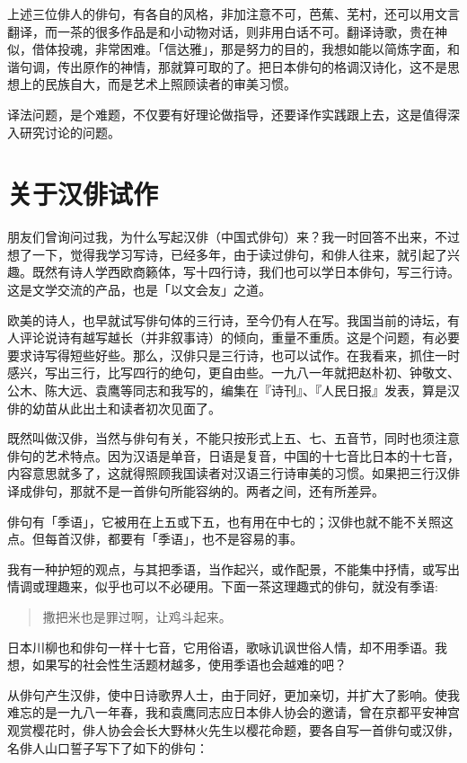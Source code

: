 {    上述三位俳人的俳句，有各自的风格，非加注意不可，芭蕉、芜村，还可以用文言翻译，而一茶的很多作品是和小动物对话，则非用白话不可。翻译诗歌，贵在神似，借体投魂，非常困难。「信达雅」，那是努力的目的，我想如能以简炼字面，和谐句调，传出原作的神情，那就算可取的了。把日本俳句的格调汉诗化，这不是思想上的民族自大，而是艺术上照顾读者的审美习惯。

    译法问题，是个难题，不仅要有好理论做指导，还要译作实践跟上去，这是值得深入研究讨论的问题。

    \section*{\FS 关于汉俳试作}

    朋友们曾询问过我，为什么写起汉俳（中国式俳句）来？我一时回答不出来，不过想了一下，觉得我学习写诗，已经多年，由于读过俳句，和俳人往来，就引起了兴趣。既然有诗人学西欧商籁体，写十四行诗，我们也可以学日本俳句，写三行诗。这是文学交流的产品，也是「以文会友」之道。

    欧美的诗人，也早就试写俳句体的三行诗，至今仍有人在写。我国当前的诗坛，有人评论说诗有越写越长（并非叙事诗）的倾向，重量不重质。这是个问题，有必要要求诗写得短些好些。那么，汉俳只是三行诗，也可以试作。在我看来，抓住一时感兴，写出三行，比写四行的绝句，更自由些。一九八一年就把赵朴初、钟敬文、公木、陈大远、袁鹰等同志和我写的，编集在『诗刊』、『人民日报』发表，算是汉俳的幼苗从此出土和读者初次见面了。

    既然叫做汉俳，当然与俳句有关，不能只按形式上五、七、五音节，同时也须注意俳句的艺术特点。因为汉语是单音，日语是复音，中国的十七音比日本的十七音，内容意思就多了，这就得照顾我国读者对汉语三行诗审美的习惯。如果把三行汉俳译成俳句，那就不是一首俳句所能容纳的。两者之间，还有所差异。

    俳句有「季语」，它被用在上五或下五，也有用在中七的；汉俳也就不能不关照这点。但每首汉俳，都要有「季语」，也不是容易的事。

    我有一种护短的观点，与其把季语，当作起兴，或作配景，不能集中抒情，或写出情调或理趣来，似乎也可以不必硬用。下面一茶这理趣式的俳句，就没有季语:

    \begin{quote}
        撒把米也是罪过啊，让鸡斗起来。
    \end{quote}

    日本川柳也和俳句一样十七音，它用俗语，歌咏讥讽世俗人情，却不用季语。我想，如果写的社会性生活题材越多，使用季语也会越难的吧？

    从俳句产生汉俳，使中日诗歌界人士，由于同好，更加亲切，并扩大了影响。使我难忘的是一九八一年春，我和袁鹰同志应日本俳人协会的邀请，曾在京都平安神宫观赏樱花时，俳人协会会长大野林火先生以樱花命题，要各自写一首俳句或汉俳，名俳人山口誓子写下了如下的俳句：

}
